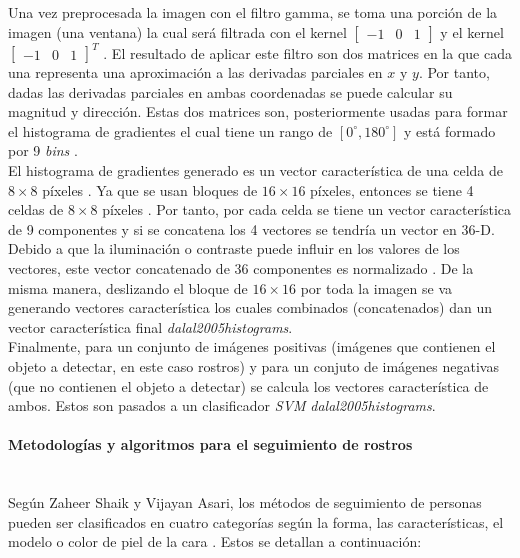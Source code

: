 \documentclass[a4paper,openright,12pt]{report}
\begin{document}
Una vez preprocesada la imagen con el filtro gamma, se toma una porción de la
imagen (una ventana) la cual será filtrada con el kernel
$[\begin{matrix}-1 & 0 & 1\end{matrix}]$ y el kernel
$[\begin{matrix}-1 & 0 & 1\end{matrix}]^T$ \cite{dalal2005histograms}.
El resultado de aplicar este filtro son dos matrices en la que cada una
representa una aproximación a las derivadas parciales en $x$ y $y$.
Por tanto, dadas las derivadas parciales en ambas coordenadas se puede calcular
su magnitud y dirección. Estas dos matrices son, posteriormente usadas para
formar el histograma de gradientes el cual tiene un rango de
$[0^\circ, 180^\circ]$ y está formado por 9 \textit{bins}
\cite{dalal2005histograms}.\\

El histograma de gradientes generado es un vector característica de una celda
de $8 \times 8$ píxeles \cite{dalal2005histograms}. Ya que se usan bloques de
$16 \times 16$ píxeles, entonces se tiene 4 celdas de $8 \times 8$ píxeles
\cite{dalal2005histograms}. Por tanto, por cada celda se tiene un vector
característica de 9 componentes y si se concatena los 4 vectores se tendría un
vector en 36-D. Debido a que la iluminación o contraste puede influir 
en los valores de los vectores, este vector concatenado de 36 componentes es
normalizado \cite{dalal2005histograms}. De la misma manera, deslizando el
bloque de $16 \times 16$ por toda la imagen se va generando vectores
característica los cuales combinados (concatenados) dan un vector característica
final \textit{dalal2005histograms}.\\
Finalmente, para un conjunto de imágenes positivas (imágenes que contienen el
objeto a detectar, en este caso rostros) y para un conjuto de imágenes negativas
(que no contienen el objeto a detectar) se calcula los vectores característica
de ambos. Estos son pasados a un clasificador \textit{SVM}
\textit{dalal2005histograms}.

\paragraph{Metodologías y algoritmos para el seguimiento de rostros}\mbox{} \\
Según Zaheer Shaik y Vijayan Asari, los métodos de seguimiento de personas
pueden ser clasificados en cuatro categorías según la forma, las características,
el modelo o color de piel de la cara \cite{shaik2007robust}. Estos se detallan
a continuación:
\end{document}
